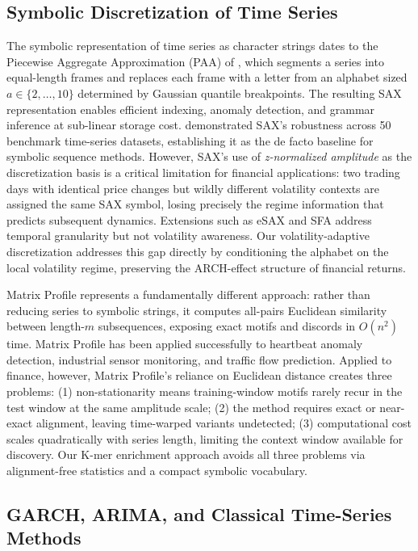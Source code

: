\documentclass[11pt]{article}
\begin{document}
\subsection{Symbolic Discretization of Time Series}

The symbolic representation of time series as character strings dates
to the Piecewise Aggregate Approximation (PAA) of
\citet{lin2003symbolic}, which segments a series into equal-length
frames and replaces each frame with a letter from an alphabet sized
$a \in \{2, \ldots, 10\}$ determined by Gaussian quantile breakpoints.
The resulting SAX representation enables efficient indexing, anomaly
detection, and grammar inference at sub-linear storage cost.
\citet{lin2007experiencing} demonstrated SAX's robustness across 50
benchmark time-series datasets, establishing it as the de facto
baseline for symbolic sequence methods.  However, SAX's use of
\emph{z-normalized amplitude} as the discretization basis is a critical
limitation for financial applications: two trading days with identical
price changes but wildly different volatility contexts are assigned the
same SAX symbol, losing precisely the regime information that predicts
subsequent dynamics.  Extensions such as eSAX and SFA
\citep{sezer2020financial} address temporal granularity but not
volatility awareness.  Our volatility-adaptive discretization addresses
this gap directly by conditioning the alphabet on the local volatility
regime, preserving the ARCH-effect structure of financial returns.

Matrix Profile \citep{yeh2016matrix} represents a fundamentally
different approach: rather than reducing series to symbolic strings, it
computes all-pairs Euclidean similarity between length-$m$ subsequences,
exposing exact motifs and discords in $O(n^2)$ time.  Matrix Profile
has been applied successfully to heartbeat anomaly detection,
industrial sensor monitoring, and traffic flow prediction.  Applied to
finance, however, Matrix Profile's reliance on Euclidean distance
creates three problems: (1) non-stationarity means training-window
motifs rarely recur in the test window at the same amplitude scale;
(2) the method requires exact or near-exact alignment, leaving
time-warped variants undetected; (3) computational cost scales
quadratically with series length, limiting the context window available
for discovery.  Our K-mer enrichment approach avoids all three problems
via alignment-free statistics and a compact symbolic vocabulary.

\subsection{GARCH, ARIMA, and Classical Time-Series Methods}
\end{document}
